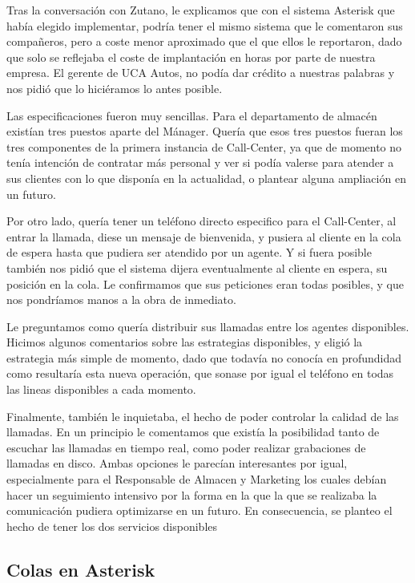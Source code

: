Tras la conversación con Zutano, le explicamos que con el sistema Asterisk que había elegido implementar, podría tener el mismo sistema que le comentaron sus compañeros, pero a coste menor aproximado que el que ellos le reportaron, dado que solo se reflejaba el coste de implantación en horas por parte de nuestra empresa. El gerente de UCA Autos, no podía dar crédito a nuestras palabras y nos pidió que lo hiciéramos lo antes posible.

Las especificaciones fueron muy sencillas. Para el departamento de almacén existían tres puestos aparte del Mánager. Quería que esos tres puestos fueran los tres componentes de la primera instancia de Call-Center, ya que de momento no tenía intención de contratar más personal y ver si podía valerse para atender a sus clientes con lo que disponía en la actualidad, o plantear alguna ampliación en un futuro. 

Por otro lado, quería tener un teléfono directo especifico para el Call-Center, al entrar la llamada, diese un mensaje de bienvenida, y pusiera al cliente en la cola de espera hasta que pudiera ser atendido por un agente. Y si fuera posible también nos pidió que el sistema dijera eventualmente al cliente en espera, su posición en la cola. Le confirmamos que sus peticiones eran todas posibles, y que nos pondríamos manos a la obra de inmediato.

Le preguntamos como quería distribuir sus llamadas entre los agentes disponibles. Hicimos algunos comentarios sobre las estrategias disponibles, y eligió la estrategia más simple de momento, dado que todavía no conocía en profundidad como resultaría esta nueva operación, que sonase por igual el teléfono en todas las lineas disponibles a cada momento.

Finalmente, también le inquietaba, el hecho de poder controlar la calidad de las llamadas. En un principio le comentamos que existía la posibilidad tanto de escuchar las llamadas en tiempo real, como poder realizar grabaciones de llamadas en disco. Ambas opciones le parecían interesantes por igual, especialmente para el Responsable de Almacen y Marketing los cuales debían hacer un seguimiento intensivo por la forma en la que la que se realizaba la comunicación pudiera optimizarse en un futuro. En consecuencia, se planteo el hecho de tener los dos servicios disponibles

\newpage

\color[rgb]{0,0,0}

\subsection{Colas en Asterisk}

